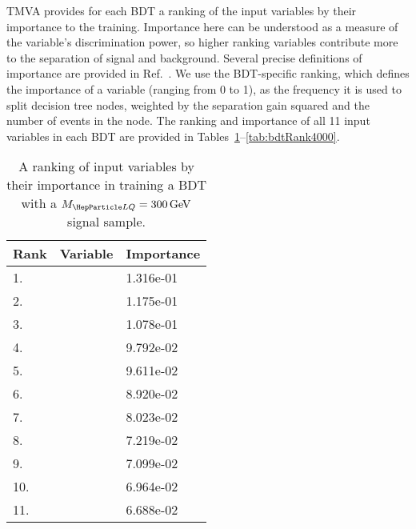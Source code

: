TMVA provides for each BDT a ranking of the input variables by their importance to the training. Importance here can be understood as a measure of the variable's discrimination power, so higher ranking variables contribute more to the separation of signal and background. Several precise definitions of importance are provided in Ref.~\cite{TMVA}. We use the BDT-specific ranking, which defines the importance of a variable (ranging from 0 to 1), as the frequency it is used to split decision tree nodes, weighted by the separation gain squared and the number of events in the node. The ranking and importance of all 11 input variables in each BDT are provided in Tables~\ref{tab:bdtRank300}--\ref{tab:bdtRank4000}.

\begin{table}[H]
	\caption{A ranking of input variables by their importance in training a BDT with a $\MLQ = \SI{300}{GeV}$ signal sample.}
	\begin{center}
		\begin{tabular}{lll} \hline \hline
			Rank & Variable & Importance  \\ \hline
			1. & \MujTwo & 1.316e-01 \\
			2. & \MujOne & 1.175e-01 \\
			3. & \ptof{\PmuTwo} & 1.078e-01 \\
			4. & \Muu & 9.792e-02 \\
			5. & \DRof{\PmuOne+\PmuTwo}{\PjOne} & 9.611e-02 \\
			6. & \Muujj & 8.920e-02 \\
			7. & \MET & 8.023e-02 \\
			8. & \ptof{\PmuOne} & 7.219e-02 \\
			9. & \ptof{\PjOne} & 7.099e-02 \\
			10. & \ptof{\PjTwo} & 6.964e-02 \\
			11. & \ST & 6.688e-02 \\ \hline \hline
		\end{tabular}
		\label{tab:bdtRank300}
	\end{center}
\end{table}

